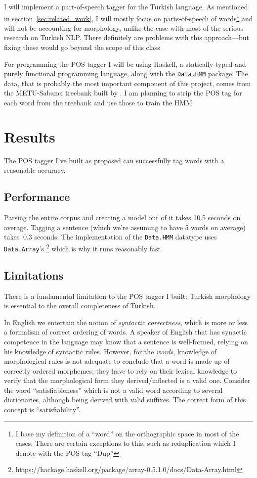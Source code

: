 \documentclass{article}
\newcommand{\hmmURL}{https://hackage.haskell.org/package/hmm-0.2.1.1/docs/Data-HMM.html}
\begin{document}
I will implement a part-of-speech tagger for the Turkish language. As
mentioned in section~\ref{sec:related_work}, I will mostly focus on parts-of-speech
of words\footnote{I base my definition of a ``word'' on the orthographic space in
  most of the cases. There are certain exceptions to this, such as
  reduplication which I denote with the POS tag ``Dup''} and will not be
accounting for morphology, unlike
the case with most of the serious research on Turkish NLP. There definitely are
problems with this approach---but fixing these would go beyond the scope of
this class

For programming the POS tagger I will be using Haskell, a statically-typed and purely
functional programming language, along with the
\href{\hmmURL}{\texttt{Data.HMM}} package.
The data, that is probably the most important component of this
project, comes from the METU-Sabanc{\i} treebank built by
\citet{oflazer2003building}.  I am planning to strip the POS tag for each word from
the treebank and use those to train the HMM

\section{Results}
The POS tagger I've built as proposed can successfully tag words with a
reasonable accuracy.

\subsection{Performance}
Parsing the entire corpus and creating a model out of it takes 10.5 seconds on
average. Tagging a sentence (which we're assuming to have 5 words on average)
takes $~0.3$ seconds. The implementation of the \texttt{Data.HMM} datatype uses
\texttt{Data.Array}'s
\footnote{https://hackage.haskell.org/package/array-0.5.1.0/docs/Data-Array.html}
which is why it runs reasonably fast.

\subsection{Limitations}
There is a fundamental limitation to the POS tagger I built: Turkish morphology
is essential to the overall completeness of Turkish.

In English we entertain the notion of \emph{syntactic correctness}, which is
more or less a formalism of correct ordering of words. A speaker of English that has
synactic competence in the language \citep{bachman1990} may know that a sentence
is well-formed, relying on his knowledge of syntactic rules. However, for the
\textit{words}, knowledge of morphological rules is not adequate to conclude
that a word is made up of correctly ordered morphemes; they have to rely on
their lexical knowledge to verify that the morphological form they
derived/inflected is a valid one. Consider the word ``satisfiableness'' which
is not a valid word according to several dictionaries, although being derived
with valid suffixes. The correct form of this concept is ``satisfiability''.
\end{document}
